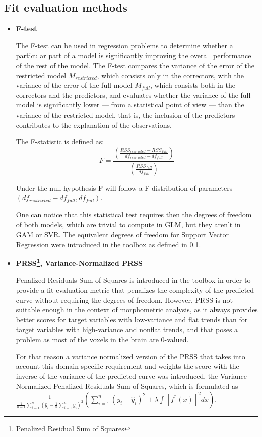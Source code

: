 \documentclass{article}
\begin{document}
\subsection{Fit evaluation methods}
\begin{itemize}
\item \textbf{F-test} 

The F-test can be used in regression problems to determine whether a particular part of a model is significantly improving the overall performance of the rest of the model.
The F-test compares the variance of the error of the restricted model $M_{restricted}$, which consists only in the correctors, with the variance of the error of the full model $M_{full}$, which consists both in the correctors and the predictors, and evaluates whether the variance of the full model is significantly lower — from a statistical point of view — than the variance of the restricted model, that is, the inclusion of the predictors contributes to the explanation of the observations.

The F-statistic is defined as:
\begin{equation}
F = \frac{(\frac{RSS_{restricted} - RSS_{full}}{df_{restricted} - df_{full}})}{(\frac{RSS_{full}}{df_{full}})}
\end{equation}

Under the null hypothesis F will follow a F-distribution of parameters $(df_{restricted} - df_{full}, df_{full})$.

One can notice that this statistical test requires then the degrees of freedom of both models, which are trivial to compute in GLM, but they aren't in GAM or SVR. The equivalent degrees of freedom for Support Vector Regression were introduced in the toolbox as defined in \ref{}.

\item \textbf{PRSS\footnote{Penalized Residual Sum of Squares}, Variance-Normalized PRSS} 

Penalized Residuals Sum of Squares is introduced in the toolbox in order to provide a fit evaluation metric that penalizes the complexity of the predicted curve without requiring the degrees of freedom. However, PRSS is not suitable enough in the context of morphometric analysis, as it always provides better scores for target variables with low-variance and flat trends than for target variables with high-variance and nonflat trends, and that poses a problem as most of the voxels in the brain are 0-valued. 

For that reason a variance normalized version of the PRSS that takes into account this domain specific requirement and weights the score with the inverse of the variance of the predicted curve was introduced, the Variance Normalized Penalized Residuals Sum of Squares, which is formulated as $\frac{1}{\frac{1}{n-1} \sum_{i=1}^{n} (\hat{y}_i - \frac{1}{n} \sum_{i=1}^{n} \hat{y}_i)^2} (\sum_{i=1}^{n} (y_i - \hat{y}_i)^2 + \lambda \int{}^{} [f^{''}(x)]^2 dx)$.

\end{itemize}
\end{document}
